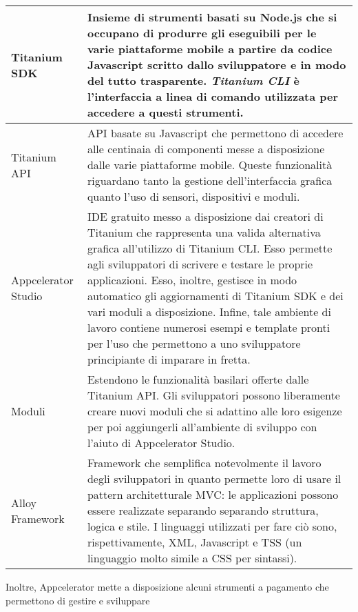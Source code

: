 				\begin{center}
					\begin{tabular}[H]{p{} p{}}
						Titanium SDK 			& Insieme di strumenti basati su Node.js che si occupano di produrre
										  gli eseguibili per le varie piattaforme mobile a partire da codice
										  Javascript scritto dallo sviluppatore e in modo del tutto
										  trasparente. \emph{Titanium CLI} è l'interfaccia a linea di
										  comando utilizzata per accedere a questi strumenti.\\
						\hline
						Titanium API			& API basate su Javascript che permettono di accedere alle centinaia
										  di componenti	messe a disposizione dalle varie piattaforme mobile.
										  Queste funzionalità riguardano tanto la gestione dell'interfaccia
										  grafica quanto l'uso di sensori, dispositivi e moduli.\\
						\hline
						Appcelerator Studio		& IDE gratuito messo a disposizione dai creatori di Titanium che
										  rappresenta una valida alternativa grafica all'utilizzo di 
										  Titanium CLI. Esso permette agli sviluppatori di scrivere e 
										  testare le proprie applicazioni. Esso, inoltre, gestisce in modo
										  automatico gli aggiornamenti di Titanium SDK e dei vari moduli a
										  disposizione. Infine, tale ambiente di lavoro contiene numerosi
										  esempi e template pronti per l'uso che permettono a uno
										  sviluppatore principiante di imparare in fretta.\\
						\hline
						Moduli				& Estendono le funzionalità basilari offerte dalle Titanium API. Gli
										  sviluppatori possono liberamente creare nuovi moduli che si
										  adattino alle loro esigenze per poi aggiungerli all'ambiente di
										  sviluppo con l'aiuto di Appcelerator Studio.\\
						\hline
						Alloy Framework			& Framework che semplifica notevolmente il lavoro degli sviluppatori
										  in quanto permette loro di usare il pattern architetturale MVC: le
										  applicazioni possono essere realizzate separando separando
										  struttura, logica e stile. I linguaggi utilizzati per fare ciò
										  sono, rispettivamente, XML, Javascript e TSS (un linguaggio molto
										  simile a CSS per sintassi).\\
					\end{tabular}
				\end{center}
				Inoltre, Appcelerator mette a disposizione alcuni strumenti a pagamento che permettono di gestire e sviluppare
